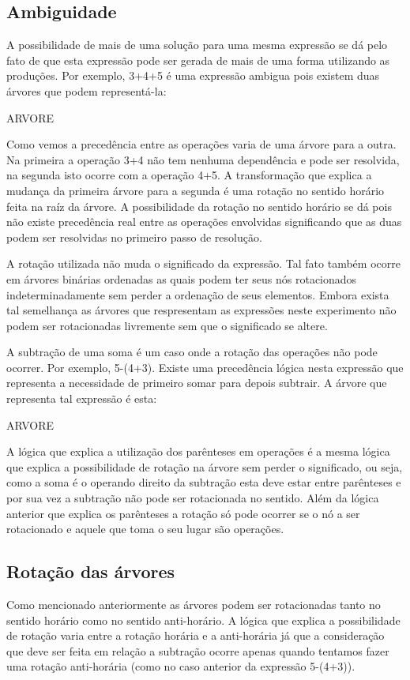 \subsection{Ambiguidade}
A possibilidade de mais de uma solução para uma mesma expressão se dá pelo fato de que esta expressão pode ser gerada de mais de uma forma utilizando as produções. Por exemplo, 3+4+5 é uma expressão ambigua pois existem duas árvores que podem representá-la:

ARVORE
     
Como vemos a precedência entre as operações varia de uma árvore para a outra. Na primeira a operação 3+4 não tem nenhuma dependência e pode ser resolvida, na segunda isto ocorre com a operação 4+5. A transformação que explica a mudança da primeira árvore para a segunda é uma rotação no sentido horário feita na raíz da árvore. A possibilidade da rotação no sentido horário se dá pois não existe precedência real entre as operações envolvidas significando que as duas podem ser resolvidas no primeiro passo de resolução.

	A rotação utilizada não muda o significado da expressão. Tal fato também ocorre em árvores binárias ordenadas as quais podem ter seus nós rotacionados indeterminadamente sem perder a ordenação de seus elementos. Embora exista tal semelhança as árvores que respresentam as expressões neste experimento não podem ser rotacionadas livremente sem que o significado se altere.
	
	A subtração de uma soma é um caso onde a rotação das operações não pode ocorrer. Por exemplo, 5-(4+3). Existe uma precedência lógica nesta expressão que representa a necessidade de primeiro somar para depois subtrair. A árvore que representa tal expressão é esta:
	
ARVORE
           
A lógica que explica a utilização dos parênteses em operações é a mesma lógica que explica  a possibilidade de rotação na árvore sem perder o significado, ou seja, como a soma é o operando direito da subtração esta deve estar entre parênteses e por sua vez a subtração não pode ser rotacionada no sentido. Além da lógica anterior que explica os parênteses a rotação só pode ocorrer se o nó a ser rotacionado e aquele que toma o seu lugar são operações.

\subsection{Rotação das árvores}
Como mencionado anteriormente as árvores podem ser rotacionadas tanto no sentido horário como no sentido anti-horário. A lógica que explica a possibilidade de rotação varia entre a rotação horária e a anti-horária já que a consideração que deve ser feita em relação a subtração ocorre apenas quando tentamos fazer uma rotação anti-horária (como no caso anterior da expressão 5-(4+3)).


